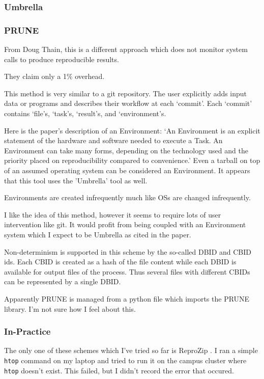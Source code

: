 \documentclass[american]{article}
\begin{document}
\subsubsection{Umbrella} \label{sec:umbrella}


\subsubsection{PRUNE} \label{sec:prune}

From Doug Thain, this is a different approach which does not monitor system calls to produce reproducible results.

They claim only a 1\% overhead.

This method is very similar to a git repository. The user explicitly adds input data or programs and describes their workflow at each `commit'. Each `commit' contains `file's, `task's, `result's, and `environment's.

Here is the paper's description of an Environment: `An Environment is an explicit statement of the hardware and software needed to execute a Task. An Environment can take many forms, depending on the technology used and the priority placed on reproducibility compared to convenience.' Even a tarball on top of an assumed operating system can be considered an Environment. It appears that this tool uses the 'Umbrella' tool as well.

Environments are created infrequently much like OSs are changed infrequently.

I like the idea of this method, however it seems to require lots of user intervention like git. It would profit from being coupled with an Environment system which I expect to be Umbrella as cited in the paper.

Non-determinism is supported in this scheme by the so-called DBID and CBID ids. Each CBID is created as a hash of the file content while each DBID is available for output files of the process. Thus several files with different CBIDs can be represented by a single DBID.

Apparently PRUNE is managed from a python file which imports the PRUNE library. I'm not sure how I feel about this.

\subsubsection{In-Practice} \label{sec:software-watchers-practice}

The only one of these schemes which I've tried so far is ReproZip \cite{reprozip}. I ran a simple \texttt{htop} command on my laptop and tried to run it on the campus cluster where \texttt{htop} doesn't exist. This failed, but I didn't record the error that occured.
\end{document}
